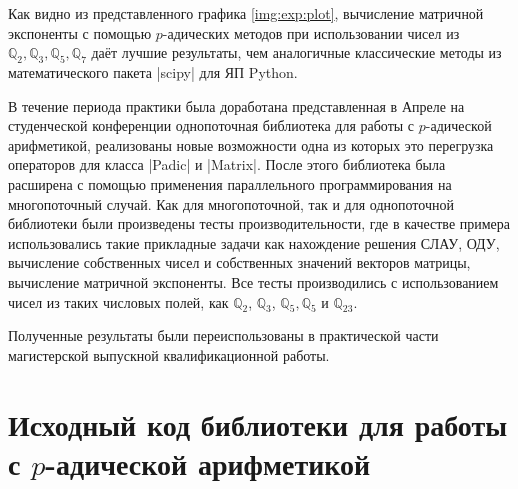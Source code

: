 \documentclass[master, och, times, pract]{sty/SCWorks}
\theoremstyle{plain}
\theoremstyle{definition}
\numberwithin{equation}{section}
\begin{document}
Как видно из представленного графика \ref{img:exp:plot}, вычисление матричной экспоненты с помощью $p$-адических методов при использовании чисел из $\mathbb{Q}_2, \mathbb{Q}_3, \mathbb{Q}_5, \mathbb{Q}_7$ даёт лучшие результаты, чем аналогичные классические методы из математического пакета |scipy| для ЯП Python.


\conclusion

В течение периода практики была доработана представленная в Апреле на студенческой конференции однопоточная библиотека для работы с $p$-адической арифметикой, реализованы новые возможности одна из которых это перегрузка операторов для класса |Padic| и |Matrix|. После этого библиотека была расширена с помощью применения параллельного программирования на многопоточный случай. Как для многопоточной, так и для однопоточной библиотеки были произведены тесты производительности, где в качестве примера использовались такие прикладные задачи как нахождение решения СЛАУ, ОДУ, вычисление собственных чисел и собственных значений векторов матрицы, вычисление матричной экспоненты. Все тесты производились с использованием чисел из таких числовых полей, как $\mathbb{Q}_2$, $\mathbb{Q}_3$, $\mathbb{Q}_5, \mathbb{Q}_5$ и $\mathbb{Q}_{23}$.

Полученные результаты были переиспользованы в практической части магистерской выпускной квалификационной работы.




\appendix

\section{Исходный код библиотеки для работы с $p$-адической арифметикой}







\end{document}
